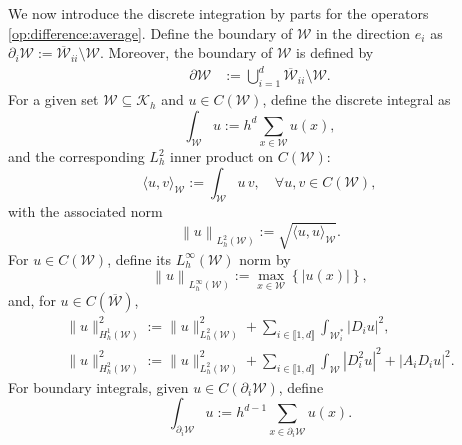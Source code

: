 \documentclass{amsart}
\numberwithin{equation}{section}
\begin{document}
We now introduce the discrete integration by parts for the operators \eqref{op:difference:average}. Define the boundary of $\mathcal{W}$ in the direction $e_{i }$ as $\partial_{i}\mathcal{W}:= \overline{\mathcal{W}}_{ii}\setminus\mathcal{W}$. Moreover, the boundary of $\mathcal{W}$ is defined by
\begin{equation}
    \begin{split}
      \partial \mathcal{W}&:= \bigcup_{i=1}^{d} \overline{\mathcal{W}}_{ii}\setminus\mathcal{W}.
    \end{split}
\end{equation}
For a given set $\mathcal{W}\subseteq\mathcal{K}_{h}$ and $u\in C(\mathcal{W})$, define the discrete integral as
\begin{equation}
    \int_{\mathcal{W}} u:= h^{d}\sum_{x\in \mathcal{W}} u(x),
\end{equation}
and the corresponding $L^{2}_{h}$ inner product on $C(\mathcal{W})$:
\begin{equation}
    \langle u,v\rangle_{\mathcal{W}}:= \int_{\mathcal{W}}u\,v,\quad \forall u,v\in C(\mathcal{W}),
\end{equation}
with the associated norm
\begin{equation}
    \left\|u\right\|_{L^{2}_{h}(\mathcal{W})}:= \sqrt{\langle u,u\rangle_{\mathcal{W}}}.
\end{equation}
For $u\in C(\mathcal{W})$, define its $L^{\infty}_{h}(\mathcal{W})$ norm by
\begin{equation}
    \left\| u\right\|_{L_{h}^{\infty}(\mathcal{W})}:= \max_{x\in \mathcal{W}}\left\{ |u(x)|\right\},
\end{equation}
and, for $u\in C(\overline{\mathcal{W}})$,
\begin{align}
    \|u\|^2_{H^{1}_{h}(\mathcal{W})}:=\|u\|_{L_{h}^{2}(\mathcal{W})}^2+\sum_{i\in\llbracket 1,d\rrbracket}\int_{\mathcal{W}^\ast_i}|D_{i}u|^{2},\\
    \|u\|^2_{H^{2}_{h}(\mathcal{W})}:=\|u\|_{L_{h}^{2}(\mathcal{W})}^2+\sum_{i\in\llbracket 1,d\rrbracket}\int_{\mathcal{W}}|D^{2}_{i}u|^{2}+|A_{i}D_{i}u|^{2}.
\end{align}
For boundary integrals, given $u\in C(\partial_{i}\mathcal{W})
$, define
\begin{equation}
    \int_{\partial_{i}\mathcal{W}} u:= h^{d-1}\sum_{x\in\partial_{i}\mathcal{W}} u(x).
\end{equation}
\end{document}

